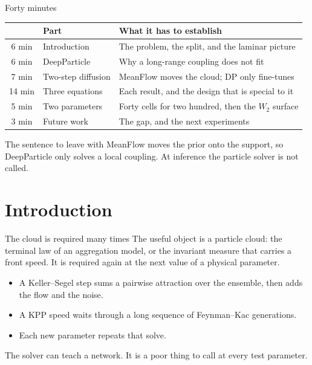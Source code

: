 \documentclass[aspectratio=169,11pt,t]{beamer}
\newcommand{\sectime}{}
\begin{document}
\begin{frame}{Forty minutes}
  \begin{tabular}{@{}clp{7.6cm}@{}}
    \toprule
    & Part & What it has to establish \\
    \midrule
    6 min & Introduction & The problem, the split, and the laminar picture \\
    6 min & DeepParticle & Why a long-range coupling does not fit \\
    7 min & Two-step diffusion & MeanFlow moves the cloud; DP only fine-tunes \\
    14 min & Three equations & Each result, and the design that is special to it \\
    5 min & Two parameters & Forty cells for two hundred, then the $W_2$ surface \\
    3 min & Future work & The gap, and the next experiments \\
    \bottomrule
  \end{tabular}

  \vspace{0.45em}
  \begin{alertblock}{The sentence to leave with}
    MeanFlow moves the prior onto the support, so DeepParticle only solves a local coupling.
    At inference the particle solver is not called.
  \end{alertblock}
\end{frame}

\renewcommand{\sectime}{About six minutes}
\section[Introduction]{Introduction}

\begin{frame}{The cloud is required many times}
  The useful object is a particle cloud: the terminal law of an aggregation model, or the invariant measure that carries a front speed.
  It is required again at the next value of a physical parameter.
  \vspace{0.5em}
  \begin{itemize}
    \item A Keller--Segel step sums a pairwise attraction over the ensemble, then adds the flow and the noise.
    \item A KPP speed waits through a long sequence of Feynman--Kac generations.
    \item Each new parameter repeats that solve.
  \end{itemize}
  \vspace{0.4em}
  The solver can teach a network.
  It is a poor thing to call at every test parameter.
\end{frame}
\end{document}

